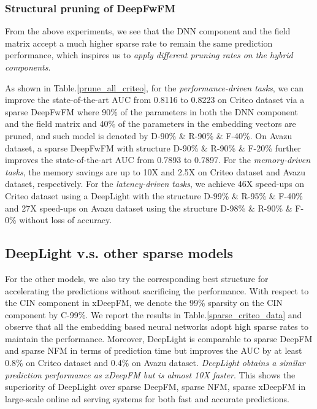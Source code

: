 \documentclass[sigconf]{acmart}
\begin{document}
\subsubsection{\textbf{Structural pruning of DeepFwFM}}
From the above experiments, we see that the DNN component and the field matrix  accept a much higher sparse rate to remain the same prediction performance, which inspires us to \emph{apply different pruning rates on the hybrid components}. 

As shown in Table.\ref{prune_all_criteo}, for the \emph{performance-driven tasks}, we can improve the state-of-the-art AUC from 0.8116 to 0.8223 on Criteo dataset via a sparse DeepFwFM where 90\% of the parameters in both the DNN component and the field matrix  and 40\% of the parameters in the embedding vectors are pruned, and such model is denoted by D-90\% \& R-90\% \& F-40\%. On Avazu dataset, a sparse DeepFwFM with structure D-90\% \& R-90\% \& F-20\% further improves the state-of-the-art AUC from 0.7893 to 0.7897. For the \emph{memory-driven tasks}, the memory savings are up to 10X and 2.5X on Criteo dataset and Avazu dataset, respectively. For the \emph{latency-driven tasks}, we achieve 46X speed-ups on Criteo dataset using a DeepLight with the structure D-99\% \& R-95\% \& F-40\% and 27X speed-ups on Avazu dataset using the structure D-98\% \& R-90\% \& F-0\% without loss of accuracy. 





\subsection{{DeepLight v.s. other sparse models}}

For the other models, we also try the corresponding best structure for accelerating the predictions without sacrificing the performance. With respect to the CIN component in xDeepFM, we denote the 99\% sparsity on the CIN component by C-99\%. We report the results in Table.\ref{sparse_criteo_data} and observe that all the embedding based neural networks adopt high sparse rates to maintain the performance. Moreover, DeepLight is comparable to sparse DeepFM and sparse NFM in terms of prediction time but improves the AUC by at least 0.8\% on Criteo dataset and 0.4\% on Avazu dataset. \emph{DeepLight obtains a similar prediction performance as xDeepFM but is almost 10X faster}. This shows the superiority of DeepLight over sparse DeepFM, sparse NFM, sparse xDeepFM in large-scale online ad serving systems for both fast and accurate predictions.
\end{document}
